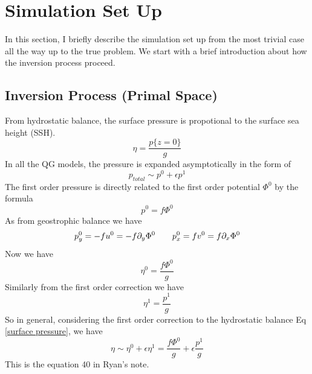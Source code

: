 \documentclass[../SQG_notes.tex]{subfiles}
\begin{document}
\section{Simulation Set Up}

In this section, I briefly describe the simulation set up from the most trivial case all the way up to the true problem. We start with a brief introduction about how the inversion process proceed. 

\subsection{Inversion Process (Primal Space)}
From hydrostatic balance, the surface pressure is propotional to the surface sea height (SSH). 
\begin{equation}
    \eta = \frac{p\{z = 0\}}{g} \label{surface pressure}
\end{equation}
In all the QG models, the pressure is expanded asymptotically in the form of 
\begin{equation}
    p_{total} \sim p^0 + \epsilon p^1
\end{equation}
The first order pressure is directly related to the first order potential $\Phi^0$ by the formula 
\[ p^0 = f\Phi^0\]
As from geostrophic balance we have 
\[ p^0_y = -f u^0 = -f \partial_y \Phi^0 \qquad p^0_x = f v^0 = f \partial_x \Phi^0\]
Now we have 
\[ \eta^0 = \frac{f\Phi^0}{g}\]
Similarly from the first order correction we have 
\[ \eta^1 = \frac{p^1}{g}\]
So in general, considering the first order correction to the hydrostatic balance Eq \ref{surface pressure}, we have 
\begin{equation}
    \eta \sim \eta^0 + \epsilon\eta^1 = \frac{f\Phi^0}{g} +\epsilon \frac{p^1}{g} \label{True sea surface height}
\end{equation}
This is the equation 40 in Ryan's note. \par
\end{document}
